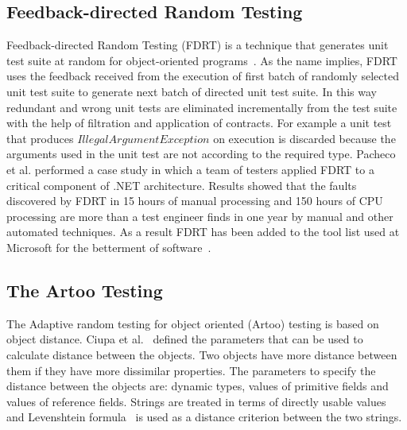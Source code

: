 
\subsection{Feedback-directed Random Testing}
Feedback-directed Random Testing (FDRT) is a technique that generates unit test suite at random for object-oriented programs~\cite{pacheco2007randoop}. As the name implies, FDRT uses the feedback received from the execution of first batch of randomly selected unit test suite to generate next batch of directed unit test suite. In this way redundant  and wrong unit tests are eliminated incrementally from the test suite with the help of filtration and application of contracts. For example a unit test that produces $IllegalArgumentException$ on execution is discarded because the arguments used in the unit test are not according to the required type. Pacheco et al. performed a case study in which a team of testers applied FDRT to a critical component of .NET architecture. Results showed that the faults discovered by FDRT in 15 hours of manual processing and 150 hours of CPU processing are more than a test engineer finds in one year by manual and other automated techniques. As a result FDRT has been added to the tool list used at Microsoft for the betterment of software~\cite{pacheco2008finding}. 



\subsection{The Artoo Testing}
The Adaptive random testing for object oriented (Artoo) testing is based on object distance. Ciupa et al.~\cite{ciupa2006object} defined the parameters that can be used to calculate distance between the objects. Two objects have more distance between them if they have more dissimilar properties. The parameters to specify the distance between the objects are: dynamic types, values of primitive fields and values of reference fields. Strings are treated in terms of directly usable values and Levenshtein formula~\cite{levenshtein1966binary} is used as a distance criterion between the two strings.

